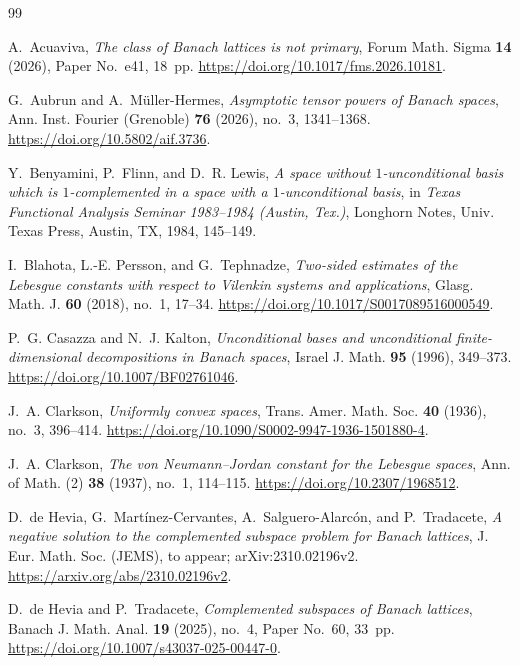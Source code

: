 \documentclass[11pt,a4paper,reqno]{amsart}
\theoremstyle{definition}
\numberwithin{equation}{section}
\begin{document}
\begin{thebibliography}{99}
\setlength{\baselineskip}{0.95\baselineskip}

A.~Acuaviva, \emph{The class of Banach lattices is not primary}, Forum Math. Sigma \textbf{14} (2026), Paper No.~e41, 18~pp. \url{https://doi.org/10.1017/fms.2026.10181}.

G.~Aubrun and A.~M\"uller-Hermes, \emph{Asymptotic tensor powers of Banach spaces}, Ann. Inst. Fourier (Grenoble) \textbf{76} (2026), no.~3, 1341--1368. \url{https://doi.org/10.5802/aif.3736}.

Y.~Benyamini, P.~Flinn, and D.~R. Lewis, \emph{A space without $1$-unconditional basis which is $1$-complemented in a space with a $1$-unconditional basis}, in \emph{Texas Functional Analysis Seminar 1983--1984 (Austin, Tex.)}, Longhorn Notes, Univ. Texas Press, Austin, TX, 1984, 145--149.

I.~Blahota, L.-E. Persson, and G.~Tephnadze, \emph{Two-sided estimates of the Lebesgue constants with respect to Vilenkin systems and applications}, Glasg. Math. J. \textbf{60} (2018), no.~1, 17--34. \url{https://doi.org/10.1017/S0017089516000549}.

P.~G. Casazza and N.~J. Kalton, \emph{Unconditional bases and unconditional finite-dimensional decompositions in Banach spaces}, Israel J. Math. \textbf{95} (1996), 349--373. \url{https://doi.org/10.1007/BF02761046}.

J.~A. Clarkson, \emph{Uniformly convex spaces}, Trans. Amer. Math. Soc. \textbf{40} (1936), no.~3, 396--414. \url{https://doi.org/10.1090/S0002-9947-1936-1501880-4}.

J.~A. Clarkson, \emph{The von Neumann--Jordan constant for the Lebesgue spaces}, Ann. of Math. (2) \textbf{38} (1937), no.~1, 114--115. \url{https://doi.org/10.2307/1968512}.

D.~de Hevia, G.~Mart\'inez-Cervantes, A.~Salguero-Alarc\'on, and P.~Tradacete, \emph{A negative solution to the complemented subspace problem for Banach lattices}, J. Eur. Math. Soc. (JEMS), to appear; arXiv:2310.02196v2. \url{https://arxiv.org/abs/2310.02196v2}.

D.~de Hevia and P.~Tradacete, \emph{Complemented subspaces of Banach lattices}, Banach J. Math. Anal. \textbf{19} (2025), no.~4, Paper No.~60, 33~pp. \url{https://doi.org/10.1007/s43037-025-00447-0}.


\end{thebibliography}
\end{document}
